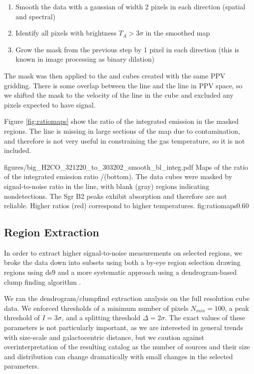 \begin{enumerate}
    \item Smooth the data with a gaussian of width 2 pixels in each direction
        (spatial and spectral)
    \item Identify all pixels with brightness $T_A > 3\sigma$ in the smoothed
        map
    \item Grow the mask from the previous step by 1 pixel in each direction
        (this is known in image processing as binary dilation)
\end{enumerate}

The \formaldehyde \threeohthree mask was then applied to the \threetwoone and
\threetwotwo cubes created with the same PPV gridding.  There is some overlap
between the \methanol \fourtwotwo line and the \formaldehyde \threetwotwo
line in PPV space, so we shifted the \formaldehyde mask to the velocity of the
\methanol line in the \formaldehyde \threetwotwo cube and excluded any pixels
expected to have signal.

Figure \ref{fig:ratiomaps} show the ratio of the integrated emission in the
masked regions.  The \threetwotwo line is missing in large sections of the map
due to \methanol contamination, and therefore is not very useful in constraining
the gas temperature, so it is not included.


\Figure
{figures/big_H2CO_321220_to_303202_smooth_bl_integ.pdf}
{Maps of the ratio of the integrated emission ratio
\threetwoone/\threeohthree (bottom).  The data cubes were masked by
signal-to-noise ratio in the \threeohthree line, with blank (gray) regions
indicating nondetections.  The Sgr B2 peaks exhibit \formaldehyde
absorption and therefore are not reliable.  Higher ratios (red) correspond
to higher temperatures.
}
{fig:ratiomaps}{0.6}{0}

\subsection{Region Extraction}
In order to extract higher signal-to-noise measurements on selected regions, we
broke the data down into subsets using both a by-eye region selection drawing
regions using ds9 and a more systematic approach using a dendrogram-based clump
finding algorithm \citep[][\url{http://dendrograms.org/}]{Rosolowsky2008c}.

We ran the dendrogram/clumpfind extraction analysis on the full resolution
\threeohthree cube data.  We enforced thresholds of a minimum number of pixels
$N_{min}=100$, a peak threshold of $I = 3\sigma$, and a splitting threshold
$\Delta = 2\sigma$.  The exact values of these parameters is not particularly
important, as we are interested in general trends with size-scale and
galactocentric distance, but we caution against overinterpretation of the
resulting catalog as the number of sources and their size and distribution can
change dramatically with small changes in the selected parameters.

